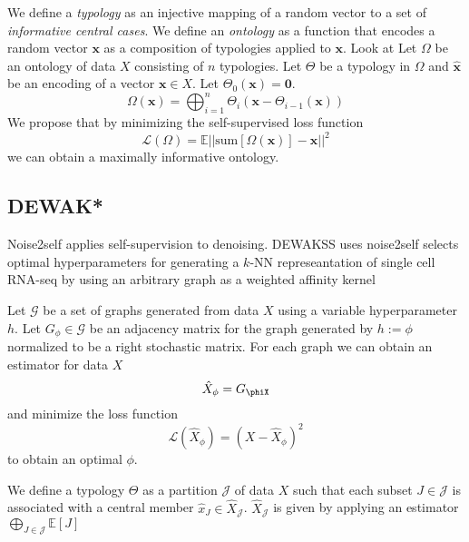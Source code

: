\documentclass{article}
\begin{document}
We define a \textit{typology} as an injective mapping of a random vector to a set of \textit{informative central cases}.%
We define an \textit{ontology} as a function that encodes a random vector $\mathbf{x}$ as a composition of typologies applied to $\mathbf{x}$.
Look at
Let $\Omega$ be an ontology of data $X$ consisting of $n$ typologies.
Let $\Theta$ be a typology in $\Omega$ and $\mathbf{\hat{x}}$ be an encoding of a vector $\mathbf{x} \in X$.
Let $\Theta_0(\mathbf{x}) = \mathbf{0}$.
\begin{equation}
  \Omega(\mathbf{x}) = \bigoplus_{i=1}^{n}\Theta_i(\mathbf{x} - \Theta_{i-1}(\mathbf{x}))
\end{equation}
We propose that by minimizing the self-supervised loss function
\begin{equation}
  \mathcal{L}(\Omega) = \mathbb{E}||\mathrm{sum}[\Omega(\mathbf{x})] - \mathbf{x}||^2
\end{equation}
we can obtain a maximally informative ontology.

\subsection{DEWAK*}
Noise2self\cite{batson2019} applies self-supervision to denoising.
DEWAKSS\cite{tjarnberg2021} uses noise2self selects optimal hyperparameters for generating a $k$-NN represeantation of single cell RNA-seq by using an arbitrary graph as a weighted affinity kernel

Let $\mathcal{G}$ be a set of graphs generated from data $X$ using a variable hyperparameter $h$.
Let $G_\phi \in \mathcal{G}$ be an adjacency matrix for the graph generated by $h := \phi$ normalized to be a right stochastic matrix.
For each graph we can obtain an estimator for data $X$
\begin{equation}
  \hat{X}_\phi = G_\phiX
\end{equation}
and minimize the loss function
\begin{equation}
  \mathcal{L}(\hat{X}_\phi) = (X - \hat{X}_\phi)^2
\end{equation}
to obtain an optimal $\phi$.

We define a typology $\Theta$ as a partition $\mathcal{J}$ of data $X$ such that each subset $J \in \mathcal{J}$ is associated with a central member $\hat{x}_J \in \hat{X}_\mathcal{J}$.
$\hat{X}_\mathcal{J}$ is given by applying an estimator $\underset{J \in \mathcal{J}}{\bigoplus}\mathbb{E}[J]$
\end{document}
